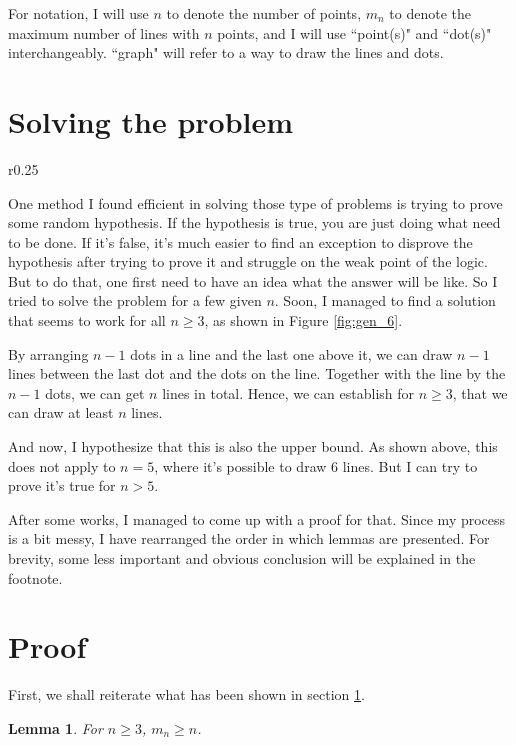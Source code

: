\documentclass[a4paper, 12pt]{article}
\newtheorem{lemma}[theorem]{Lemma}
\begin{document}
For notation, I will use $n$ to denote the number of points, $m_n$ to denote the maximum number of lines with $n$ points, and I will use ``point(s)" and ``dot(s)" interchangeably. ``graph" will refer to a way to draw the lines and dots.
\clearpage

\section{Solving the problem}\label{section:start}
\begin{wrapfigure}{r}{0.25\textwidth}
    
    \caption{general solution with $n=6$}
    \label{fig:gen_6}
\end{wrapfigure}
One method I found efficient in solving those type of problems is trying to prove some random hypothesis. If the hypothesis is true, you are just doing what need to be done. If it's false, it's much easier to find an exception to disprove the hypothesis after trying to prove it and struggle on the weak point of the logic. But to do that, one first need to have an idea what the answer will be like. So I tried to solve the problem for a few given $n$. Soon, I managed to find a solution that seems to work for all $n\geq 3$, as shown in Figure \ref{fig:gen_6}.

By arranging $n-1$ dots in a line and the last one above it, we can draw $n-1$ lines between the last dot and the dots on the line. Together with the line by the $n-1$ dots, we can get $n$ lines in total. Hence, we can establish for $n\geq 3$, that we can draw at least $n$ lines.

And now, I hypothesize that this is also the upper bound. As shown above, this does not apply to $n=5$, where it's possible to draw 6 lines. But I can try to prove it's true for $n>5$.

After some works, I managed to come up with a proof for that. Since my process is a bit messy, I have rearranged the order in which lemmas are presented. For brevity, some less important and obvious conclusion will be explained in the footnote.

\section{Proof}

First, we shall reiterate what has been shown in section \ref{section:start}.

\begin{lemma}
\label{theorem:lower_bound}
For $n\geq3$, $m_n\geq n$.
\end{lemma}
\end{document}

